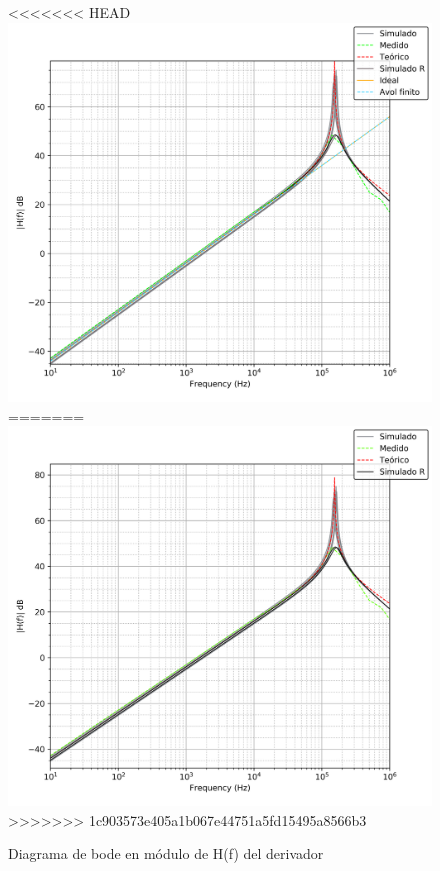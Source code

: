 \begin{figure}[H]
	\centering
<<<<<<< HEAD
	\includegraphics[scale=0.6]{Recursos/Derivador/bode_modulo.png}
=======
	\includegraphics[scale=0.6]{Recursos/Derivador/bode_modulo_correcion.png}
>>>>>>> 1c903573e405a1b067e44751a5fd15495a8566b3
	\caption{Diagrama de bode en m\'odulo de H(f) del derivador}
	\label{fig:derivador_bode_modulo}
\end{figure}

